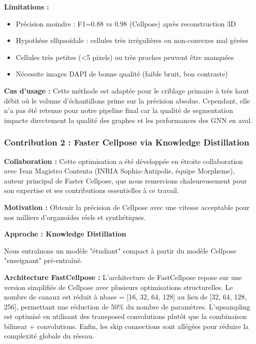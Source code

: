 \textbf{Limitations :}
\begin{itemize}
    \item Précision moindre : F1=0.88 vs 0.98 (Cellpose) après reconstruction 3D
    \item Hypothèse ellipsoïdale : cellules très irrégulières ou non-convexes mal gérées
    \item Cellules très petites (<5 pixels) ou très proches peuvent être manquées
    \item Nécessite images DAPI de bonne qualité (faible bruit, bon contraste)
\end{itemize}

\textbf{Cas d'usage :}
Cette méthode est adaptée pour le criblage primaire à très haut débit où le volume d'échantillons prime sur la précision absolue. Cependant, elle n'a pas été retenue pour notre pipeline final car la qualité de segmentation impacte directement la qualité des graphes et les performances des GNN en aval.

\subsubsection{Contribution 2 : Faster Cellpose via Knowledge Distillation}

\textbf{Collaboration :}
Cette optimisation a été développée en étroite collaboration avec Ivan Magistro Contenta (INRIA Sophia-Antipolis, équipe Morpheme), auteur principal de Faster Cellpose, que nous remercions chaleureusement pour son expertise et ses contributions essentielles à ce travail.

\textbf{Motivation :}
Obtenir la précision de Cellpose avec une vitesse acceptable pour nos milliers d'organoïdes réels et synthétiques.

\textbf{Approche : Knowledge Distillation}

Nous entraînons un modèle "étudiant" compact à partir du modèle Cellpose "enseignant" pré-entraîné.

\textbf{Architecture FastCellpose :}
L'architecture de FastCellpose repose sur une version simplifiée de Cellpose avec plusieurs optimisations structurelles. Le nombre de canaux est réduit à nbase = [16, 32, 64, 128] au lieu de [32, 64, 128, 256], permettant une réduction de 50\% du nombre de paramètres. L'upsampling est optimisé en utilisant des transposed convolutions plutôt que la combinaison bilinear + convolutions. Enfin, les skip connections sont allégées pour réduire la complexité globale du réseau.


